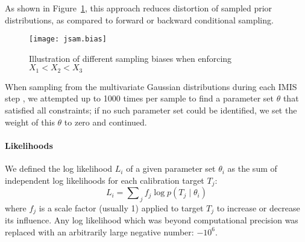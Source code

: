 As shown in Figure~\ref{fig:jsam.bias},
this approach reduces distortion of sampled \vs prior distributions,
as compared to forward or backward conditional sampling.
\begin{figure}[h]
  \centering
  \texttt{[image: jsam.bias]}
  \caption{Illustration of different sampling biases when enforcing $X_1 < X_2 < X_3$}
  \label{fig:jsam.bias}
\end{figure}
When sampling from the multivariate Gaussian distributions
during each IMIS step \cite{Raftery2010},
we attempted up to 1000 times per sample
to find a parameter set $\theta$ that satisfied all constraints;
if no such parameter set could be identified,
we set the weight of this $\theta$ to zero and continued.
\paragraph{Likelihoods}
We defined the log likelihood $L_i$ of a given parameter set $\theta_i$ as
the sum of independent log likelihoods for each calibration target $T_j$:
\begin{equation}
  L_i = \sum\nolimits_{\,j} f_j \log p(T_j \mid \theta_i)
\end{equation}
where $f_j$ is a scale factor (usually 1) applied to target $T_j$
to increase or decrease its influence.
Any log likelihood which was beyond computational precision was replaced with
an arbitrarily large negative number: $-{10}^6$.
